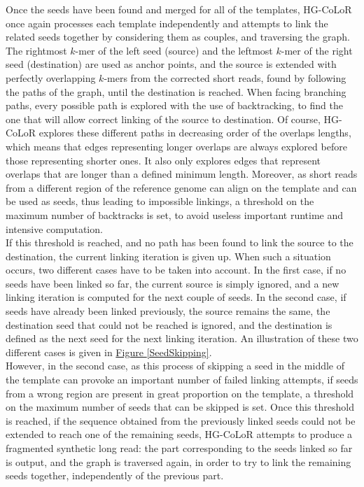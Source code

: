 \documentclass[long, final]{jobim2017}
\begin{document}
Once the seeds have been found and merged for all of the templates, HG-CoLoR once again processes each template independently and attempts to link the related seeds together by considering them as couples, and traversing the graph. The rightmost $k$-mer of the left seed (source) and the leftmost $k$-mer of the right seed (destination) are used as anchor points, and the source is extended with perfectly overlapping $k$-mers from the corrected short reads, found by following the paths of the graph, until the destination is reached. When facing branching paths, every possible path is explored with the use of backtracking, to find the one that will allow correct linking of the source to destination. Of course, HG-CoLoR explores these different paths in decreasing order of the overlaps lengths, which means that edges representing longer overlaps are always explored before those representing shorter ones. It also only explores edges that represent overlaps that are longer than a defined minimum length. Moreover, as short reads from a different region of the reference genome can align on the template and can be used as seeds, thus leading to impossible linkings, a threshold on the maximum number of backtracks is set, to avoid useless important runtime and intensive computation. \\
\indent If this threshold is reached, and no path has been found to link the source to the destination, the current linking iteration is given up. When such a situation occurs, two different cases have to be taken into account. In the first case, if no seeds have been linked so far, the current source is simply ignored, and a new linking iteration is computed for the next couple of seeds. In the second case, if seeds have already been linked previously, the source remains the same, the destination seed that could not be reached is ignored, and the destination is defined as the next seed for the next linking iteration. An illustration of these two different cases is given in
\hyperref[SeedSkipping]{Figure \ref*{SeedSkipping}}. \\
\indent However, in the second case, as this process of skipping a seed in the middle of the template can provoke an important number of failed linking attempts, if seeds from a wrong region are present in great proportion on the template, a threshold on the maximum number of seeds that can be skipped is set. 
Once this threshold is reached, if the sequence obtained from the previously linked seeds could not be extended to reach one of the remaining seeds, HG-CoLoR attempts to produce a fragmented synthetic long read: the part corresponding to the seeds linked so far is output, and the graph is traversed again, in order to try to link the remaining seeds together, independently of the previous part.
\end{document}
